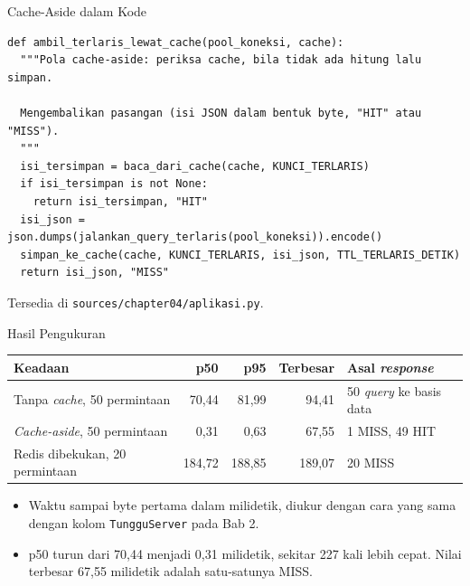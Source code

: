 \documentclass[aspectratio=169, table, 12pt]{beamer}
\begin{document}
\begin{frame}[fragile]{{\Large Cache-Aside dalam Kode}}
  \vspace{4pt}
\begin{lstlisting}[style=PythonStyle]
def ambil_terlaris_lewat_cache(pool_koneksi, cache):
  """Pola cache-aside: periksa cache, bila tidak ada hitung lalu simpan.

  Mengembalikan pasangan (isi JSON dalam bentuk byte, "HIT" atau "MISS").
  """
  isi_tersimpan = baca_dari_cache(cache, KUNCI_TERLARIS)
  if isi_tersimpan is not None:
    return isi_tersimpan, "HIT"
  isi_json = json.dumps(jalankan_query_terlaris(pool_koneksi)).encode()
  simpan_ke_cache(cache, KUNCI_TERLARIS, isi_json, TTL_TERLARIS_DETIK)
  return isi_json, "MISS"
\end{lstlisting}

  \vspace{4pt}
  {\footnotesize Tersedia di \texttt{sources/chapter04/aplikasi.py}.}
\end{frame}

\begin{frame}{{\Large Hasil Pengukuran}}
  \vspace{4pt}
  \centering
  {\footnotesize
  \begin{tabularx}{\textwidth}{Xrrrl}
    \hline
    \textbf{Keadaan} & \textbf{p50} & \textbf{p95} & \textbf{Terbesar} & \textbf{Asal \textit{response}} \\
    \hline
    Tanpa \textit{cache}, 50 permintaan & 70,44 & 81,99 & 94,41 & 50 \textit{query} ke basis data \\
    \hline
    \textit{Cache-aside}, 50 permintaan & 0,31 & 0,63 & 67,55 & 1 MISS, 49 HIT \\
    \hline
    Redis dibekukan, 20 permintaan & 184,72 & 188,85 & 189,07 & 20 MISS \\
    \hline
  \end{tabularx}}

  \vspace{6pt}
  \begin{itemize}
    \item Waktu sampai byte pertama dalam milidetik, diukur dengan cara yang
          sama dengan kolom \texttt{TungguServer} pada Bab 2.
    \item p50 turun dari 70,44 menjadi 0,31 milidetik, sekitar 227 kali lebih
          cepat. Nilai terbesar 67,55 milidetik adalah satu-satunya MISS.
  \end{itemize}
\end{frame}
\end{document}
